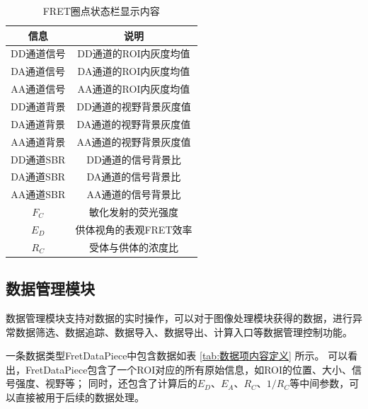 \begin{table}[htbp]
  \centering
  \caption[FRET圈点状态栏显示内容]{FRET圈点状态栏显示内容}
  \label{tab:fret_statusbar_list}
      \begin{tabular}{cc}
      \toprule[1.5pt]
      {信息} & {说明} \\
      \midrule
      DD通道信号 & DD通道的ROI内灰度均值 \\
      DA通道信号 & DA通道的ROI内灰度均值 \\
      AA通道信号 & AA通道的ROI内灰度均值 \\
      DD通道背景 & DD通道的视野背景灰度值 \\
      DA通道背景 & DA通道的视野背景灰度值 \\
      AA通道背景 & AA通道的视野背景灰度值 \\
      DD通道SBR & DD通道的信号背景比 \\
      DA通道SBR & DA通道的信号背景比 \\
      AA通道SBR & AA通道的信号背景比 \\
      $F_C$ & 敏化发射的荧光强度 \\
      $E_D$ & 供体视角的表观FRET效率 \\
      $R_C$ & 受体与供体的浓度比 \\
      \bottomrule[1.5pt]
    \end{tabular}
\end{table}

\subsection{数据管理模块}
\label{sec:数据管理模块}

数据管理模块支持对数据的实时操作，可以对于图像处理模块获得的数据，进行异常数据筛选、数据追踪、数据导入、数据导出、计算入口等数据管理控制功能。

一条数据类型FretDataPiece中包含数据如表 \ref{tab:数据项内容定义} 所示。
可以看出，FretDataPiece包含了一个ROI对应的所有原始信息，如ROI的位置、大小、信号强度、视野等；
同时，还包含了计算后的$E_D$、$E_A$、$R_C$、$1/R_C$等中间参数，可以直接被用于后续的数据处理。

